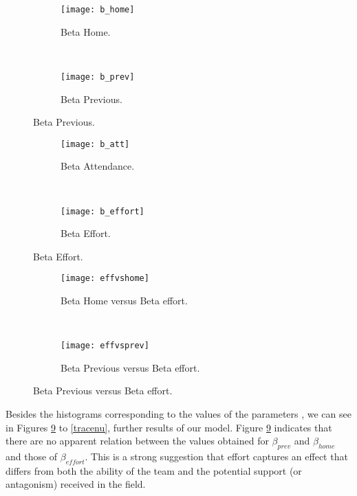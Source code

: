 \documentclass[]{article}
\begin{document}
\begin{figure}[hbt!]
	\centering
	\caption{Histograms}		
	\begin{subfigure}[t]{0.47\textwidth}
		\centering
		\scriptsize
		\texttt{[image: b\_home]}
		\caption{Beta Home. \label{fig:b_home}}
	\end{subfigure}%
	~ 
	\begin{subfigure}[t]{0.47\textwidth}
		\centering
		\scriptsize
		\texttt{[image: b\_prev]}
		\caption{Beta Previous. \label{fig:b_prev}}
	\end{subfigure}
	\label{hist}
\end{figure}

\begin{figure}[hbt!]
	\centering
	\caption{Histograms (Cont.)}		
	\begin{subfigure}[t]{0.47\textwidth}
		\centering
		\scriptsize
		\texttt{[image: b\_att]}
		\caption{Beta Attendance. \label{fig:b_att}}
	\end{subfigure}%
	~ 
	\begin{subfigure}[t]{0.47\textwidth}
		\centering
		\scriptsize
		\texttt{[image: b\_effort]}
		\caption{Beta Effort. \label{fig:beta_effort}}
	\end{subfigure}
	\label{histcont}
\end{figure}


\begin{figure}[hbt!]
	\centering
	\caption{Bivariate relations between parameters}		
	\begin{subfigure}[t]{0.47\textwidth}
		\centering
		\scriptsize
		\texttt{[image: effvshome]}
		\caption{Beta Home versus Beta effort. \label{fig:effvshome}}
	\end{subfigure}%
	~ 
	\begin{subfigure}[t]{0.47\textwidth}
		\centering
		\scriptsize
		\texttt{[image: effvsprev]}
		\caption{Beta Previous versus Beta effort. \label{fig:effvprev}}
	\end{subfigure}
	\label{biva}
\end{figure}


Besides the histograms corresponding to the values of the parameters , we can see in Figures \ref{biva} to \ref{tracenu}, further results of our model. Figure \ref{biva} indicates that there are no apparent relation between the values obtained for $\beta_{prev}$ and $\beta_{home}$ and those of $\beta_{effort}$. This is a strong suggestion that effort captures an effect that differs from both the ability of the team and the potential support (or antagonism) received in the field.\\
 
\end{document}
